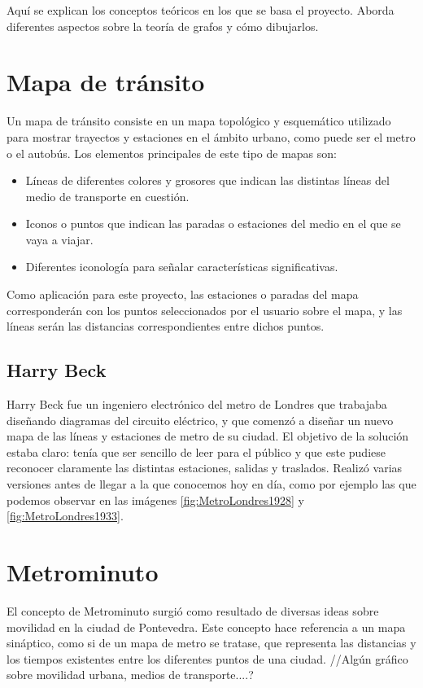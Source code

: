 
Aquí se explican los conceptos teóricos en los que se basa el proyecto. Aborda diferentes aspectos sobre la teoría de grafos y cómo dibujarlos.

\section{Mapa de tránsito}
Un mapa de tránsito consiste en un mapa topológico y esquemático utilizado para mostrar trayectos y estaciones en el ámbito urbano, como puede ser el metro o el autobús. Los elementos principales de este tipo de mapas son:
\begin{itemize}
	\item Líneas de diferentes colores y grosores que indican las distintas líneas del medio de transporte en cuestión.
	\item Iconos o puntos que indican las paradas o estaciones del medio en el que se vaya a viajar.
	\item Diferentes iconología para señalar características significativas.
\end{itemize}
Como aplicación para este proyecto, las estaciones o paradas del mapa corresponderán con los puntos seleccionados por el usuario sobre el mapa, y las líneas serán las distancias correspondientes entre dichos puntos.

\subsection{Harry Beck}
Harry Beck fue un ingeniero electrónico del metro de Londres que trabajaba diseñando diagramas del circuito eléctrico, y que comenzó a diseñar un nuevo mapa de las líneas y estaciones de metro de su ciudad. El objetivo de la solución estaba claro: tenía que ser sencillo de leer para el público y que este pudiese reconocer claramente las distintas estaciones, salidas y traslados.
Realizó varias versiones antes de llegar a la que conocemos hoy en día, como por ejemplo las que podemos observar en las imágenes \ref{fig:MetroLondres1928} y \ref{fig:MetroLondres1933}.
\label{fig:MetroLondres1928}
\label{fig:MetroLondres1933}

\section{Metrominuto}
El concepto de Metrominuto surgió como resultado de diversas ideas sobre movilidad en la ciudad de Pontevedra. Este concepto hace referencia a un mapa sináptico, como si de un mapa de metro se tratase, que representa las distancias y los tiempos existentes entre los diferentes puntos de una ciudad. 
//Algún gráfico sobre movilidad urbana, medios de transporte....?

